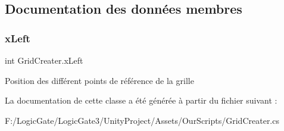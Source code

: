 \subsection{Documentation des données membres}
\mbox{\label{class_grid_creater_a1b96eaac4e4622871415c70ee7933ee9}} 
\subsubsection{\texorpdfstring{x\+Left}{xLeft}}
{\footnotesize\ttfamily int Grid\+Creater.\+x\+Left}

Position des différent points de référence de la grille 

La documentation de cette classe a été générée à partir du fichier suivant \+:\begin{DoxyCompactItemize}
\item 
F\+:/\+Logic\+Gate/\+Logic\+Gate3/\+Unity\+Project/\+Assets/\+Our\+Scripts/Grid\+Creater.\+cs\end{DoxyCompactItemize}
